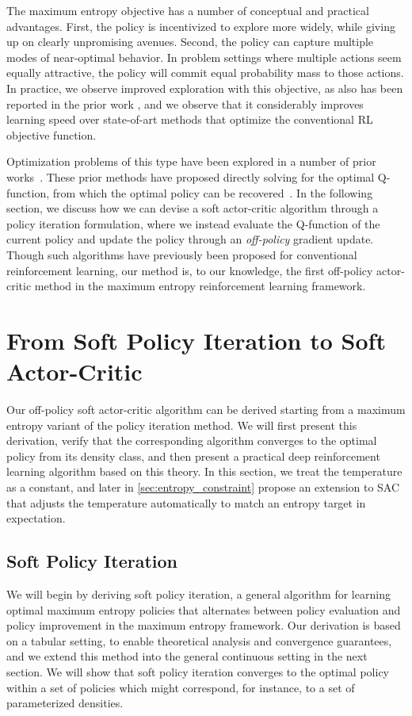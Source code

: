 The maximum entropy objective has a number of conceptual and practical advantages. First, the policy is incentivized to explore more widely, while giving up on clearly unpromising avenues. Second, the policy can capture multiple modes of near-optimal behavior. In problem settings where multiple actions seem equally attractive, the policy will commit equal probability mass to those actions. In practice, we observe improved exploration with this objective, as also has been reported in the prior work \citep{schulman2017equivalence}, and we observe that it considerably improves learning speed over state-of-art methods that optimize the conventional RL objective function. 

Optimization problems of this type have been explored in a number of prior works~\cite{kappen2005path,todorov2007linearly,ziebart2008maximum}. These prior methods have proposed directly solving for the optimal Q-function, from which the optimal policy can be recovered~\citep{ziebart2008maximum,fox2015taming,haarnoja2017reinforcement}. In the following section, we discuss how we can devise a soft actor-critic algorithm through a policy iteration formulation, where we instead evaluate the Q-function of the current policy and update the policy through an \emph{off-policy} gradient update. Though such algorithms have previously been proposed for conventional reinforcement learning, our method is, to our knowledge, the first off-policy actor-critic method in the maximum entropy reinforcement learning framework.







\section{From Soft Policy Iteration to Soft Actor-Critic} 
\label{sec:soft_policy_iteration}
Our off-policy soft actor-critic algorithm can be derived starting from a maximum entropy variant of the policy iteration method. We will first present this derivation, verify that the corresponding algorithm converges to the optimal policy from its density class, and then present a practical deep reinforcement learning algorithm based on this theory. In this section, we treat the temperature as a constant, and later in \autoref{sec:entropy_constraint} propose an extension to SAC that adjusts the temperature automatically to match an entropy target in expectation.


\subsection{Soft Policy Iteration}
We will begin by deriving soft policy iteration, a general algorithm for learning optimal maximum entropy policies that alternates between policy evaluation and policy improvement in the maximum entropy framework. Our derivation is based on a tabular setting, to enable theoretical analysis and convergence guarantees, and we extend this method into the general continuous setting in the next section. We will show that soft policy iteration converges to the optimal policy within a set of policies which might correspond, for instance, to a set of parameterized densities.

